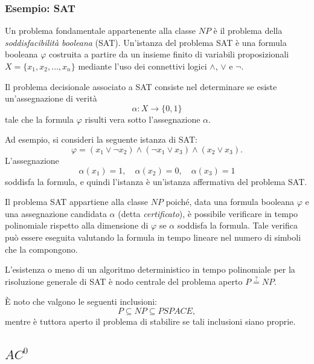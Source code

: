 \documentclass[a4paper,12pt]{report}
\theoremstyle{propositionstyle}
\begin{document}
    \subsubsection{Esempio: \textsc{SAT}}

    Un problema fondamentale appartenente alla classe $NP$ è il problema della \emph{soddisfacibilità booleana} (\textsc{SAT}).
    Un'istanza del problema \textsc{SAT} è una formula booleana $\varphi$ costruita a partire da un insieme finito di variabili proposizionali $X = \{x_1, x_2, \dots, x_n\}$ mediante l'uso dei connettivi logici $\land$, $\lor$ e $\lnot$.

    Il problema decisionale associato a \textsc{SAT} consiste nel determinare se esiste un'assegnazione di verità
    \[
        \alpha : X \rightarrow \{0,1\}
    \]
    tale che la formula $\varphi$ risulti vera sotto l'assegnazione $\alpha$.

    Ad esempio, si consideri la seguente istanza di \textsc{SAT}:
    \[
        \varphi = (x_1 \lor \lnot x_2) \land (\lnot x_1 \lor x_3) \land (x_2 \lor x_3).
    \]
    L'assegnazione
    \[
        \alpha(x_1) = 1, \quad \alpha(x_2) = 0, \quad \alpha(x_3) = 1
    \]
    soddisfa la formula, e quindi l'istanza è un'istanza affermativa del problema \textsc{SAT}.

    Il problema \textsc{SAT} appartiene alla classe $NP$ poiché, data una formula booleana $\varphi$ e una assegnazione candidata $\alpha$ (detta \emph{certificato}), è possibile verificare in tempo polinomiale rispetto alla dimensione di $\varphi$ se $\alpha$ soddisfa la formula.
    Tale verifica può essere eseguita valutando la formula in tempo lineare nel numero di simboli che la compongono.

    L'esistenza o meno di un algoritmo deterministico in tempo polinomiale per la risoluzione generale di \textsc{SAT} è nodo centrale del problema aperto $P \stackrel{?}{=} NP$.

    È noto che valgono le seguenti inclusioni:
    \[
        P \subseteq NP \subseteq PSPACE,
    \]
    mentre è tuttora aperto il problema di stabilire se tali inclusioni siano proprie.

    \subsection{$AC^0$}
\end{document}
